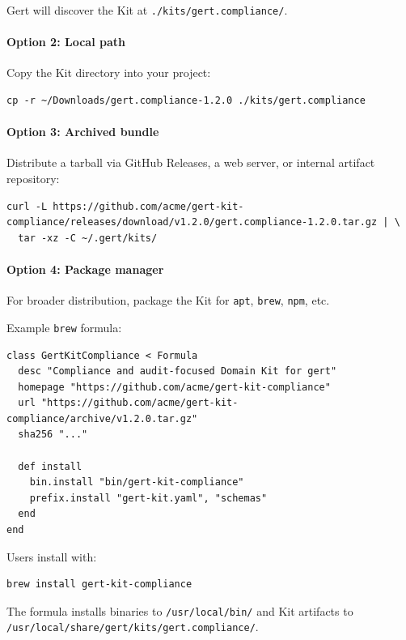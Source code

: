 Gert will discover the Kit at \texttt{./kits/gert.compliance/}.

\paragraph{Option 2: Local path}

Copy the Kit directory into your project:

\begin{verbatim}
cp -r ~/Downloads/gert.compliance-1.2.0 ./kits/gert.compliance
\end{verbatim}

\paragraph{Option 3: Archived bundle}

Distribute a tarball via GitHub Releases, a web server, or internal artifact
repository:

\begin{verbatim}
curl -L https://github.com/acme/gert-kit-compliance/releases/download/v1.2.0/gert.compliance-1.2.0.tar.gz | \
  tar -xz -C ~/.gert/kits/
\end{verbatim}

\paragraph{Option 4: Package manager}

For broader distribution, package the Kit for \texttt{apt}, \texttt{brew},
\texttt{npm}, etc.

Example \texttt{brew} formula:

\begin{verbatim}
class GertKitCompliance < Formula
  desc "Compliance and audit-focused Domain Kit for gert"
  homepage "https://github.com/acme/gert-kit-compliance"
  url "https://github.com/acme/gert-kit-compliance/archive/v1.2.0.tar.gz"
  sha256 "..."

  def install
    bin.install "bin/gert-kit-compliance"
    prefix.install "gert-kit.yaml", "schemas"
  end
end
\end{verbatim}

Users install with:

\begin{verbatim}
brew install gert-kit-compliance
\end{verbatim}

The formula installs binaries to \texttt{/usr/local/bin/} and Kit artifacts to
\texttt{/usr/local/share/gert/kits/gert.compliance/}.

